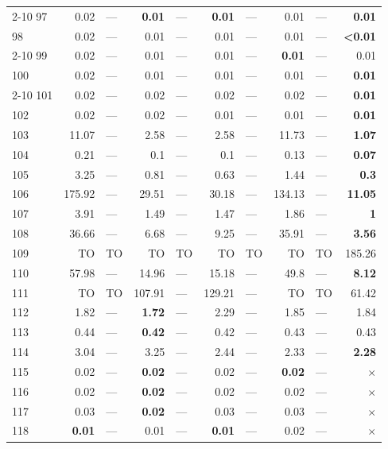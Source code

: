 \begin{longtable}{lr@{\hskip 4pt}l@{\hskip 12pt}r@{\hskip 4pt}l@{\hskip 12pt}r@{\hskip 4pt}l@{\hskip 12pt}r@{\hskip 4pt}l@{\hskip 12pt}r}
\cmidrule{2-10}
97 & 0.02 & --- & \textbf{0.01} & --- & \textbf{0.01} & --- & 0.01 & --- & \textbf{0.01} \\
98 & 0.02 & --- & 0.01 & --- & 0.01 & --- & 0.01 & --- & \textbf{<0.01} \\
\cmidrule{2-10}
99 & 0.02 & --- & 0.01 & --- & 0.01 & --- & \textbf{0.01} & --- & 0.01 \\
100 & 0.02 & --- & 0.01 & --- & 0.01 & --- & 0.01 & --- & \textbf{0.01} \\
\cmidrule{2-10}
101 & 0.02 & --- & 0.02 & --- & 0.02 & --- & 0.02 & --- & \textbf{0.01} \\
102 & 0.02 & --- & 0.02 & --- & 0.01 & --- & 0.01 & --- & \textbf{0.01} \\
\midrule
103 & 11.07 & --- & 2.58 & --- & 2.58 & --- & 11.73 & --- & \textbf{1.07} \\
104 & 0.21 & --- & 0.1 & --- & 0.1 & --- & 0.13 & --- & \textbf{0.07} \\
105 & 3.25 & --- & 0.81 & --- & 0.63 & --- & 1.44 & --- & \textbf{0.3} \\
106 & 175.92 & --- & 29.51 & --- & 30.18 & --- & 134.13 & --- & \textbf{11.05} \\
107 & 3.91 & --- & 1.49 & --- & 1.47 & --- & 1.86 & --- & \textbf{1} \\
108 & 36.66 & --- & 6.68 & --- & 9.25 & --- & 35.91 & --- & \textbf{3.56} \\
109 & TO & TO & TO & TO & TO & TO & TO & TO & 185.26 \\
110 & 57.98 & --- & 14.96 & --- & 15.18 & --- & 49.8 & --- & \textbf{8.12} \\
111 & TO & TO & 107.91 & --- & 129.21 & --- & TO & TO & 61.42 \\
112 & 1.82 & --- & \textbf{1.72} & --- & 2.29 & --- & 1.85 & --- & 1.84 \\
113 & 0.44 & --- & \textbf{0.42} & --- & 0.42 & --- & 0.43 & --- & 0.43 \\
114 & 3.04 & --- & 3.25 & --- & 2.44 & --- & 2.33 & --- & \textbf{2.28} \\
\midrule
115 & 0.02 & --- & \textbf{0.02} & --- & 0.02 & --- & \textbf{0.02} & --- & $\times$ \\
116 & 0.02 & --- & \textbf{0.02} & --- & 0.02 & --- & 0.02 & --- & $\times$ \\
117 & 0.03 & --- & \textbf{0.02} & --- & 0.03 & --- & 0.03 & --- & $\times$ \\
118 & \textbf{0.01} & --- & 0.01 & --- & \textbf{0.01} & --- & 0.02 & --- & $\times$ \\

\end{longtable}
